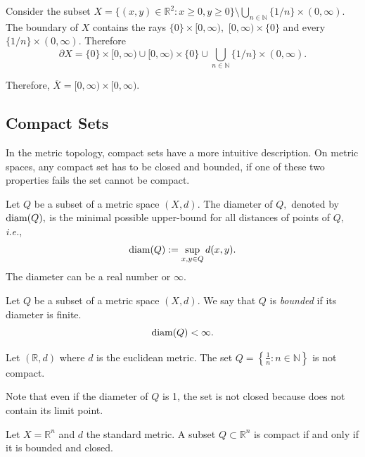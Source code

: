 \documentclass[
	fontsize=10pt, %
	twoside=false, %
	secnumdepth=1, %
]{kaobook}
\begin{document}
\begin{example}
Consider the subset $X=\{(x,y)\in\mathbb{R}^2: x\geq 0, y\geq 0\}\setminus \bigcup_{n\in\mathbb{N}} \{1/n\}\times (0,\infty).$ The boundary of $X$ contains the rays $\{0\}\times[0,\infty),$ $ [0,\infty)\times\{0\}$ and every $\{1/n\}\times (0,\infty).$ Therefore $$\partial X = \{0\}\times[0,\infty)\cup  [0,\infty)\times\{0\}\cup \bigcup_{n\in \mathbb{N}} \{1/n\}\times (0,\infty).$$

Therefore, $\overline{X}=[0,\infty)\times[0,\infty).$
\end{example}

\subsection{Compact Sets}

In the metric topology, compact sets have a more intuitive description. On metric spaces,  any compact set has to be closed and bounded, if one of these two properties fails the set cannot be compact. 

\begin{definition}
Let $Q$ be a subset of a metric space $(X,d).$ The diameter of $Q,$ denoted by $\mbox{\upshape{diam}}(Q),$ is the minimal possible upper-bound for all distances of points of $Q,$ \emph{i.e.}, $$\mbox{\upshape{diam}}(Q):=\sup_{x,y\in Q} d(x,y).$$ The diameter can be a real number or $\infty.$
\end{definition}


\begin{definition}
Let $Q$ be a subset of a metric space $(X,d).$ We say that $Q$ is \emph{bounded} if its diameter is finite. $$\mbox{\upshape{diam}}(Q)<\infty.$$
\end{definition}

\begin{example}
Let $(\mathbb{R},d)$ where $d$ is the euclidean metric. The set $Q=\left\{\frac{1}{n}: n\in\mathbb{N}\right\}$ is not compact. 

Note that even if the diameter of $Q$ is 1, the set is not closed because does not contain its limit point. 
\end{example}

\begin{proposition}
\label{C1:P1:CompactClosedBounded}
Let $X=\mathbb{R}^n$ and $d$ the standard metric. A subset $Q\subset \mathbb{R}^n$ is compact if and only if it is bounded and closed.
\end{proposition}
\end{document}
